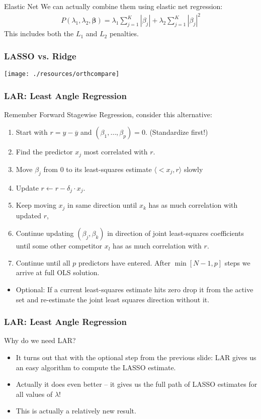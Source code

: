 \documentclass[xcolor=pdftex,dvipsnames,table,mathserif,aspectratio=169]{beamer}
\begin{document}
\begin{frame}{Elastic Net}
We can actually combine them using \alert{elastic net regression}:
\begin{eqnarray*}
 P(\lambda_1,\lambda_2,\mathbf{\beta}) =  \lambda _1\sum_{j=1}^K | \beta_j|  +\lambda_2 \sum_{j=1}^K | \beta_j|^2 
 \end{eqnarray*}
 This includes both the $L_1$ and $L_2$ penalties.
\end{frame}

\begin{frame}
\frametitle{LASSO vs. Ridge}
\begin{center}
\texttt{[image: ./resources/orthcompare]}
\end{center}
\end{frame}


\begin{frame}
\frametitle{LAR: Least Angle Regression}
Remember Forward Stagewise Regression, consider this alternative:
\begin{enumerate}
\item Start with $r= y-\overline{y}$ and $(\beta_1, \ldots, \beta_p) = 0$. (Standardize first!)
\item Find the predictor $x_j$ most correlated with $r$.
\item Move $\beta_j$ from 0 to its least-squares estimate $\langle<x_j , r \rangle$ slowly
\item Update $r \leftarrow r - \delta_j \cdot x_j$.
\item Keep moving $x_j$ in same direction until $x_k$ has as much correlation with updated $r$,
\item Continue updating $(\beta_j, \beta_k)$ in direction of \alert{joint} least-squares coefficients until some other competitor $x_l$ has as much correlation with $r$.
\item Continue until all $p$ predictors have entered. After $\min[N-1,p]$ steps we arrive at full OLS solution.
\end{enumerate}
\begin{itemize}
\item \alert{Optional:} If a current least-squares estimate hits zero drop it from the active set and re-estimate the joint least squares direction without it.
\end{itemize}
\end{frame}


\begin{frame}
\frametitle{LAR: Least Angle Regression}
Why do we need LAR?
\begin{itemize}
\item It turns out that with the optional step from the previous slide: LAR gives us an easy algorithm to compute the LASSO estimate.
\item Actually it does even better -- it gives us the full path of LASSO estimates for all values of $\lambda$!
\item This is actually a relatively new result.
\end{itemize}
\end{frame}
\end{document}
